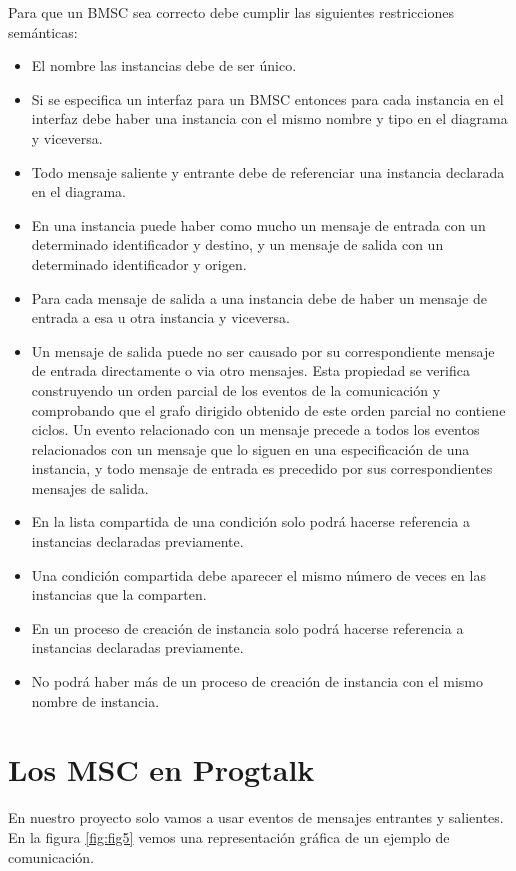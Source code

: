 Para que un BMSC sea correcto debe cumplir las siguientes
restricciones semánticas:
\begin{itemize}
\item El nombre las instancias debe de ser único.
\item Si se especifica un interfaz para un BMSC entonces para cada
instancia en el interfaz debe haber una instancia con el mismo 
nombre y tipo en el diagrama y viceversa.
\item Todo mensaje saliente y entrante debe de referenciar una
instancia declarada en el diagrama.
\item En una instancia puede haber como mucho un mensaje de entrada
con un determinado identificador y destino, y un mensaje de salida con
un determinado identificador y origen.
\item Para cada mensaje de salida a una instancia debe de haber un 
mensaje de entrada a esa u otra instancia y viceversa.
\item Un mensaje de salida puede no ser causado por su correspondiente
mensaje de entrada directamente o via otro mensajes.     
Esta propiedad se verifica construyendo un orden parcial de los 
eventos de la comunicación y comprobando que el grafo dirigido 
obtenido de este orden parcial no contiene ciclos. Un evento
relacionado con un mensaje precede a todos los eventos relacionados
con un mensaje que lo siguen en una especificación de una instancia,
y todo mensaje de entrada es precedido por sus correspondientes 
mensajes de salida.
\item En la lista compartida de una condición solo podrá hacerse
referencia a instancias declaradas previamente.
\item Una condición compartida debe aparecer el mismo número de
veces en las instancias que la comparten.
\item En un proceso de creación de instancia solo podrá hacerse
referencia a instancias declaradas previamente.
\item No podrá haber más de un proceso de creación de instancia con
el mismo nombre de instancia.
\end{itemize}

\section{Los MSC en Progtalk}
En nuestro proyecto solo vamos a usar eventos de mensajes entrantes y
salientes. En la figura \ref{fig:fig5} vemos una representación
gráfica de un ejemplo de comunicación.

